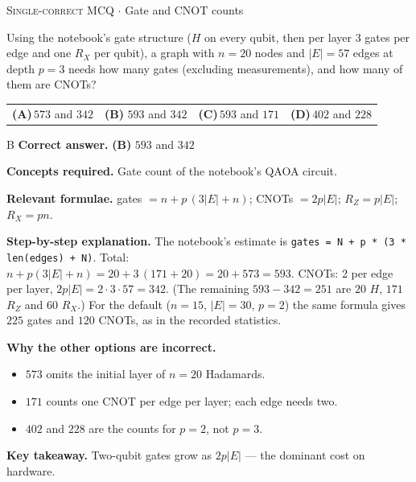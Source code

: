 \documentclass[11pt,a4paper]{article}
\newcommand{\optlabel}[1]{\textbf{(#1)}}
\newcommand{\correctlabel}[1]{\textcolor{okgreen}{\textbf{(#1)}\,\ding{51}}}
\newenvironment{qitem}[1]{\begin{list}{}{\setlength{\leftmargin}{3.3em}\setlength{\labelwidth}{3.1em}%
  \setlength{\labelsep}{0.2em}\setlength{\topsep}{3pt}\setlength{\parsep}{3pt}}\item[\textbf{Q.#1}\hfill]}{\end{list}}
\newcommand{\qsep}{\par\vspace{2pt}{\color{black!15}\hrule}\vspace{4pt}}
\newcommand{\qmeta}[2]{{\footnotesize\color{black!60}\textsc{#1} \;$\cdot$\; #2}\par}
\begin{document}
\begin{qitem}{45}
\qmeta{Single-correct MCQ}{Gate and CNOT counts}
Using the notebook's gate structure ($H$ on every qubit, then per layer 3 gates per edge and one $R_X$ per qubit), a
graph with $n = 20$ nodes and $|E| = 57$ edges at depth $p = 3$ needs how many gates (excluding measurements), and how many of
them are CNOTs?
\par\smallskip\noindent\begin{tabularx}{\linewidth}{@{}*{4}{L}@{}}
\optlabel{A}\,$573$ and $342$ & \correctlabel{B}\,$593$ and $342$ & \optlabel{C}\,$593$ and $171$ & \optlabel{D}\,$402$ and $228$
\end{tabularx}
\end{qitem}
\begin{solbox}{B}
\textbf{\color{brand}Correct answer.} \textcolor{okgreen}{\textbf{(B)}} $593$ and $342$

\textbf{\color{brand}Concepts required.} Gate count of the notebook's QAOA circuit.

\textbf{\color{brand}Relevant formulae.} gates $= n + p\,(3|E| + n)$; CNOTs $= 2p|E|$; $R_Z = p|E|$; $R_X = pn$.

\textbf{\color{brand}Step-by-step explanation.} The notebook's estimate is \texttt{gates = N + p * (3 * len(edges) + N)}.
Total: $n + p(3|E| + n) = 20 + 3\,(171 + 20) = 20 + 573 = 593$.
CNOTs: 2 per edge per layer, $2p|E| = 2\cdot3\cdot57 = 342$. (The remaining $593 - 342 = 251$ are $20$ $H$, $171$ $R_Z$ and $60$ $R_X$.)
For the default ($n = 15$, $|E| = 30$, $p = 2$) the same formula gives $225$ gates and $120$ CNOTs, as in the recorded statistics.

\textbf{\color{brand}Why the other options are incorrect.}
\begin{itemize}[leftmargin=2.4em, itemsep=1pt, topsep=2pt]
\item[\textbf{(A)}] $573$ omits the initial layer of $n = 20$ Hadamards.
\item[\textbf{(C)}] $171$ counts one CNOT per edge per layer; each edge needs two.
\item[\textbf{(D)}] $402$ and $228$ are the counts for $p = 2$, not $p = 3$.
\end{itemize}
\textbf{\color{brand}Key takeaway.} Two-qubit gates grow as $2p|E|$ --- the dominant cost on hardware.
\end{solbox}
\qsep
\end{document}

